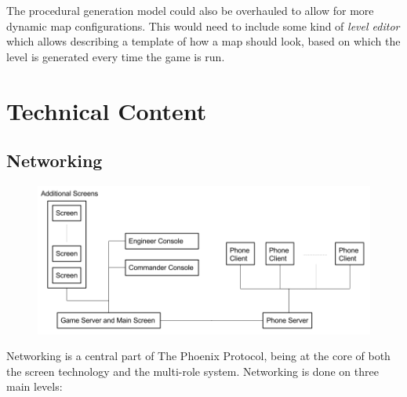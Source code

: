 \documentclass[a4paper,11pt]{article}
\begin{document}
The procedural generation model could also be overhauled to allow for more dynamic map configurations. This would need to include some kind of \emph{level editor} which allows describing a template of how a map should look, based on which the level is generated every time the game is run.
 
\clearpage

\section{Technical Content}
\subsection{Networking}

\begin{figure}[ht]
	\centering
	\includegraphics[width=\textwidth]{images/network_diagram}
    \label{fig:network_diagram}
\end{figure}

Networking is a central part of The Phoenix Protocol, being at the core of both the screen technology and the multi-role system. Networking is done on three main levels:
\end{document}
